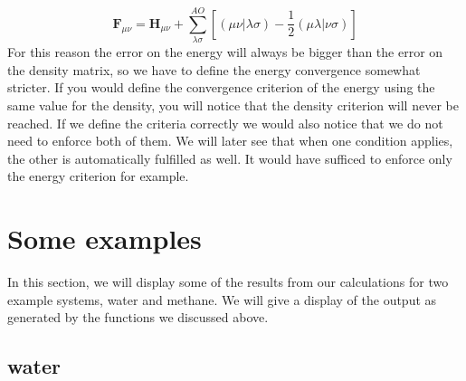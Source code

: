 \documentclass{article}
\begin{document}
 \begin{equation} \label{eq: fock matrix}
     \boldsymbol{F}_{\mu\nu} = \boldsymbol{H}_{\mu\nu} + \sum^{AO}_{\lambda\sigma}[(\mu\nu|\lambda\sigma) - \frac{1}{2}(\mu\lambda|\nu\sigma)]
 \end{equation}
 For this reason the error on the energy will always be bigger than the error on the density matrix, so we have to define the energy convergence somewhat stricter. If you would define the convergence criterion of the energy using the same value for the density, you will notice that the density criterion will never be reached. If we define the criteria correctly we would also notice that we do not need to enforce both of them. We will later see that when one condition applies, the other is automatically fulfilled as well. It would have sufficed to enforce only the energy criterion for example.
 
 \section{Some examples}
 \label{sec: examples}
 In this section, we will display some of the results from our calculations for two example systems, water and methane. We will give a display of the output as generated by the functions we discussed above.
 
 \subsection{water}
 \label{subsec:water}
\end{document}
